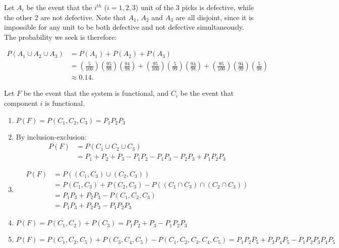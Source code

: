 \begin{problem}{28} Let $A_i$ be the event that the $i^{th}$ ($i=1, 2, 3$) unit of the 3 picks is defective, while the other 2 are not defective.  Note that $A_1$, $A_2$ and $A_3$ are all disjoint, since it is impossible for any unit to be both defective and not defective simultaneously.  The probability we seek is therefore:

\begin{align*}
P(A_1 \cup A_2 \cup A_3) & = P(A_1)+P(A_2)+P(A_3) \\
&= \left(\frac{5}{100}\right)\left(\frac{95}{99}\right)\left(\frac{94}{98}\right) +\left(\frac{95}{100}\right)\left(\frac{5}{99}\right)\left(\frac{94}{98}\right)+\left(\frac{95}{100}\right)\left(\frac{94}{99}\right)\left(\frac{5}{98}\right) \\
&\approx 0.14.
\end{align*}


\end{problem}




\begin{problem}{29} Let $F$ be the event that the system is functional, and $C_i$ be the event that component $i$ is functional.
	\begin{enumerate}
		\item $P(F) = P(C_1, C_2, C_3) = P_1 P_2 P_3$
		\item By inclusion-exclusion:
		\begin{align*} 
		P(F) &= P(C_1\cup C_2 \cup C_3) \\
		& = P_1+ P_2 +P_3 -P_1P_2-P_1P_3-P_2P_3+P_1P_2P_3
		\end{align*} 
		

		\item 
			\begin{align*}
				P(F) &= P((C_1, C_3) \cup (C_2, C_3)) \\
				& = P(C_1, C_3)+P(C_2, C_3) - P((C_1\cap C_3) \cap (C_2 \cap C_3)) \\
				& = P_1 P_3+P_2 P_3 - P(C_1, C_2, C_3) \\
				& = P_1 P_3+P_2 P_3 - P_1 P_2 P_3 
			\end{align*}
			
		\item $P(F) = P(C_1, C_2)+P(C_3) = P_1 P_2 +P_3 - P_1 P_2 P_3$
		\item $P(F) = P(C_1, C_2, C_5)+P(C_3, C_4, C_5) - P(C_1, C_2, C_3, C_4, C_5) = P_1 P_2 P_5+P_3 P_4 P_5 - P_1 P_2 P_3 P_4 P_5 $
	\end{enumerate}

\end{problem}
	
